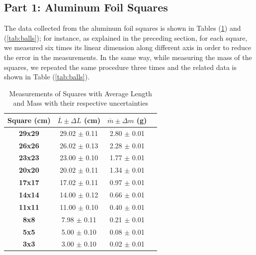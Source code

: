 \documentclass[a4paper,12pt]{article}
\begin{document}
\subsection{Part 1: Aluminum Foil Squares}
The data collected from the aluminum foil squares is shown in Tables (\ref{tab:squares}) and (\ref{tab:balls}); for instance, as explained in the preceding section, 
for each square, we measured six times its linear dimension along different axis in order to reduce the error in the measurements. 
In the same way, while measuring the mass of the squares, we repeated the same procedure three times and the related data is shown 
in Table (\ref{tab:balls}).

\begin{table}[!ht]
    \centering
    \begin{tabular}{|c|c|c|c|}
    \hline
        \textbf{Square (cm)} & \( \overline{L} \pm \Delta L \) (cm) & \( \overline{m} \pm \Delta m \) (g) \\ \hline 
        \textbf{29x29} & 29.02 \(\pm\) 0.11 & 2.80 \(\pm\) 0.01 \\ \hline
        \textbf{26x26} & 26.02 \(\pm\) 0.13 & 2.28 \(\pm\) 0.01 \\ \hline
        \textbf{23x23} & 23.00 \(\pm\) 0.10 & 1.77 \(\pm\) 0.01 \\ \hline 
        \textbf{20x20} & 20.02 \(\pm\) 0.11 & 1.34 \(\pm\) 0.01 \\ \hline
        \textbf{17x17} & 17.02 \(\pm\) 0.11 & 0.97 \(\pm\) 0.01 \\ \hline
        \textbf{14x14} & 14.00 \(\pm\) 0.12 & 0.66 \(\pm\) 0.01 \\ \hline
        \textbf{11x11} & 11.00 \(\pm\) 0.10 & 0.40 \(\pm\) 0.01 \\ \hline
        \textbf{8x8}   & 7.98  \(\pm\) 0.11 & 0.21 \(\pm\) 0.01 \\ \hline
        \textbf{5x5}   & 5.00  \(\pm\) 0.10 & 0.08 \(\pm\) 0.01 \\ \hline
        \textbf{3x3}   & 3.00  \(\pm\) 0.10 & 0.02 \(\pm\) 0.01 \\ \hline
    \end{tabular}
    \caption{Measurements of Squares with Average Length and Mass with their respective uncertainties}
    \label{tab:squares}
\end{table}
\end{document}
